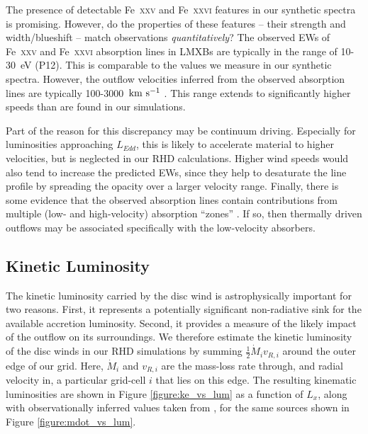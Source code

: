 \documentclass[a4paper,fleqn,usenatbib]{mnras}
\begin{document}
The presence of detectable Fe~\textsc{xxv} and Fe~\textsc{xxvi}
features in our synthetic spectra is promising. However, do the
properties of these features -- their strength and width/blueshift --
match observations {\em quantitatively}? The observed EWs of
Fe~\textsc{xxv} and Fe~\textsc{xxvi} absorption lines in LMXBs are
typically in the range of 10-30~eV (P12). This is
comparable to the values we measure in our synthetic spectra. However,
 the outflow velocities inferred from
the observed absorption lines are typically 100-3000~$\rm{km~s^{-1}}$
\cite{2016AN....337..368D,2016AN....337..512P}. This range extends to
significantly higher speeds than are found in our simulations.

Part of the reason for this
discrepancy may be continuum driving. Especially for luminosities
approaching ${L_{Edd}}$, this is likely to accelerate material to
higher velocities, but is neglected in our RHD calculations. Higher
wind speeds would also tend to increase the predicted EWs, since they
help to desaturate the line profile by spreading the opacity over a larger
velocity range. Finally, there is some evidence that the observed
absorption lines contain contributions from multiple (low- and
high-velocity) absorption ``zones'' \cite{2015ApJ...814...87M}. If so,
then thermally driven outflows may be associated specifically with 
the low-velocity absorbers.


\subsection{Kinetic Luminosity}

The kinetic luminosity carried by the disc wind is astrophysically
important for two reasons. First, it represents a potentially
significant non-radiative sink for the available accretion
luminosity. Second, it provides a measure of the likely impact of the
outflow on its surroundings. We therefore estimate the kinetic
luminosity of the disc winds in our RHD simulations by summing
$\frac{1}{2}\dot{M}_i v_{R,i}$ around the outer edge of our
grid. Here, $\dot{M}_i$ and $v_{R,i}$ are the mass-loss rate through,
and radial velocity in, a particular grid-cell $i$ that lies on this
edge. The resulting kinematic luminosities are shown in Figure
\ref{figure:ke_vs_lum} as a function of $L_x$, along with
observationally inferred values taken from
\citep{2016AN....337..512P}, for the same sources shown in
Figure \ref{figure:mdot_vs_lum}.
\end{document}

